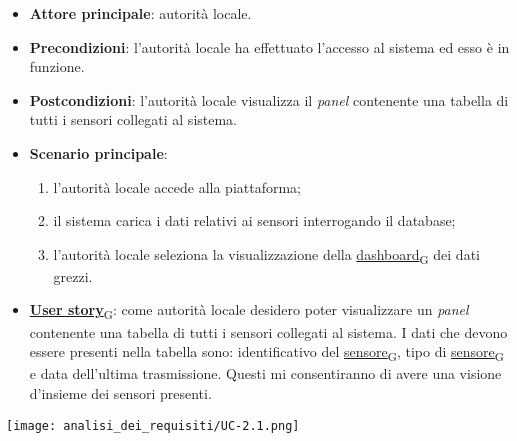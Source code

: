 \begin{itemize}
	\item \textbf{Attore principale}: autorità locale.
	\item \textbf{Precondizioni}: l'autorità locale ha effettuato l'accesso al sistema ed esso è in funzione.
	\item \textbf{Postcondizioni}: l'autorità locale visualizza il \textit{panel} contenente una tabella di tutti i sensori collegati al sistema.

	\item \textbf{Scenario principale}:
	      \begin{enumerate}
		      \item l'autorità locale accede alla piattaforma;
		      \item il sistema carica i dati relativi ai sensori interrogando il database;
		      \item l'autorità locale seleziona la visualizzazione della \href{https://7last.github.io/docs/rtb/documentazione-interna/glossario\#dashboard}{dashboard\textsubscript{G}} dei dati grezzi.
	      \end{enumerate}
	\item \href{https://7last.github.io/docs/rtb/documentazione-interna/glossario\#user-story}{\textbf{User story}\textsubscript{G}}: come autorità locale desidero poter visualizzare un \textit{panel} contenente una tabella di tutti i sensori collegati al sistema. I dati che devono essere presenti nella tabella sono: identificativo del \href{https://7last.github.io/docs/rtb/documentazione-interna/glossario\#sensore}{sensore\textsubscript{G}}, tipo di \href{https://7last.github.io/docs/rtb/documentazione-interna/glossario\#sensore}{sensore\textsubscript{G}} e data dell'ultima trasmissione. Questi mi consentiranno di avere una visione d'insieme dei sensori presenti.

\end{itemize}
\begin{center}
	\texttt{[image: analisi\_dei\_requisiti/UC-2.1.png]}
\end{center}

\newpage

